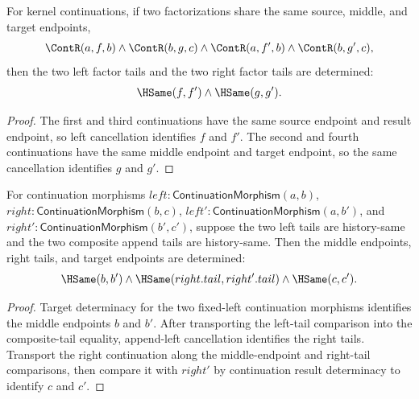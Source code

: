 \begin{theorem}
\label{thm:continuation-parallel-factor-tails-deterministic}
For kernel continuations, if two factorizations share the same source, middle,
and target endpoints,
$$
\ContR(a,f,b)\wedge\ContR(b,g,c)\wedge
\ContR(a,f',b)\wedge\ContR(b,g',c),
$$
then the two left factor tails and the two right factor tails are determined:
$$
\HSame(f,f')\wedge\HSame(g,g').
$$
\end{theorem}
\begin{proof}
The first and third continuations have the same source endpoint and result
endpoint, so left cancellation identifies $f$ and $f'$. The second and fourth
continuations have the same middle endpoint and target endpoint, so the same
cancellation identifies $g$ and $g'$.
\end{proof}

\begin{theorem}
\label{thm:continuation-morphism-comp-same-left-tail-factorization-deterministic}
For continuation morphisms
$left:\mathsf{ContinuationMorphism}(a,b)$,
$right:\mathsf{ContinuationMorphism}(b,c)$,
$left':\mathsf{ContinuationMorphism}(a,b')$, and
$right':\mathsf{ContinuationMorphism}(b',c')$, suppose the two left tails are
history-same and the two composite append tails are history-same. Then the
middle endpoints, right tails, and target endpoints are determined:
$$
\HSame(b,b')\wedge\HSame(right.tail,right'.tail)\wedge\HSame(c,c').
$$
\end{theorem}
\begin{proof}
Target determinacy for the two fixed-left continuation morphisms identifies
the middle endpoints $b$ and $b'$. After transporting the left-tail comparison
into the composite-tail equality, append-left cancellation identifies the
right tails. Transport the right continuation along the middle-endpoint and
right-tail comparisons, then compare it with $right'$ by continuation result
determinacy to identify $c$ and $c'$.
\end{proof}

